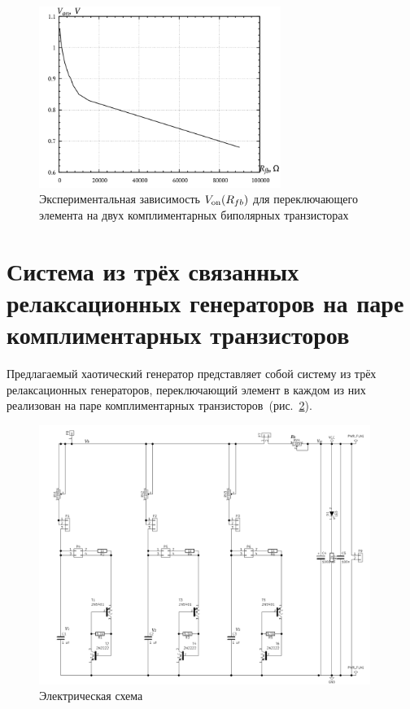 \begin{figure}[htb!]
  \centerline{\includegraphics[width=0.7\textwidth]{p/r_fb-V_on.png} }
  \caption{Экспериментальная зависимость $V_\mathrm{on}(R_{fb})$ для переключающего элемента на двух комплиментарных биполярных транзисторах}
  \label{atu:f:relax3d_bjt_v_onn}
\end{figure}



\cite{mishenko_du_small_relax}

\section{Система из трёх связанных релаксационных генераторов на паре комплиментарных транзисторов}
\label{atu:sec:relax3d}


Предлагаемый хаотический генератор представляет собой
систему из трёх релаксационных генераторов,
переключающий элемент в каждом из них реализован
на паре комплиментарных транзисторов~(рис.~\ref{atu:f:relax3d_schem}).

\begin{figure}[htb!]
  \centerline{\includegraphics[width=0.96\textwidth]{p/relax3d_schem.png} }
  \caption{Электрическая схема \RelaxBjtIi}
  \label{atu:f:relax3d_schem}
\end{figure}

